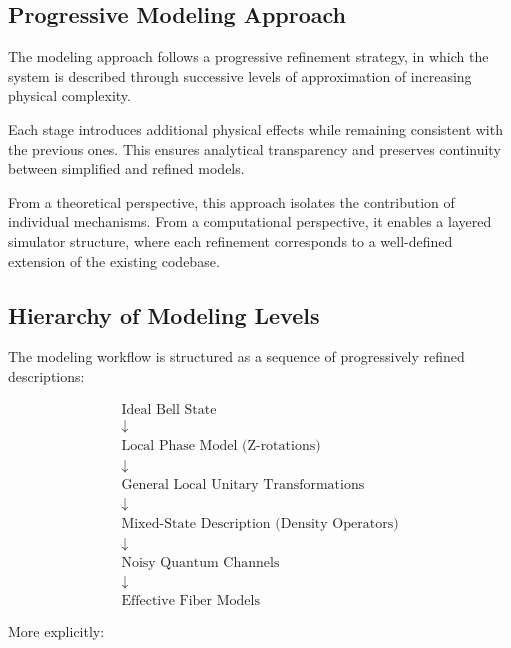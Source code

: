 \documentclass[a4paper]{article}
\begin{document}
\subsection{Progressive Modeling Approach}

The modeling approach follows a progressive refinement strategy, in which the system is described through successive levels of approximation of increasing physical complexity.

Each stage introduces additional physical effects while remaining consistent with the previous ones. This ensures analytical transparency and preserves continuity between simplified and refined models.

\medskip

From a theoretical perspective, this approach isolates the contribution of individual mechanisms. From a computational perspective, it enables a layered simulator structure, where each refinement corresponds to a well-defined extension of the existing codebase.

\medskip


\subsection{Hierarchy of Modeling Levels}

The modeling workflow is structured as a sequence of progressively refined descriptions:

\[
\begin{array}{c}
\text{Ideal Bell State} \\
\downarrow \\
\text{Local Phase Model (Z-rotations)} \\
\downarrow \\
\text{General Local Unitary Transformations} \\
\downarrow \\
\text{Mixed-State Description (Density Operators)} \\
\downarrow \\
\text{Noisy Quantum Channels} \\
\downarrow \\
\text{Effective Fiber Models}
\end{array}
\]

\medskip

More explicitly:
\end{document}
